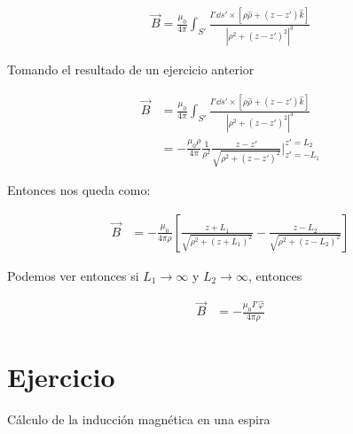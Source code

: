 \documentclass[11pt]{report}
\theoremstyle{plain}
\theoremstyle{definition}
\begin{document}
\begin{align*} %
	\vec{B} = \frac{\mu_0}{4\pi}\int_{S'} \frac{I'\dd{s'}\times\left[\rho\hat{\rho} + \left(z- z'\right)\hat{k}\right]}{|\rho^2 + \left(z- z'\right)^2|^3}
\end{align*}

Tomando el resultado de un ejercicio anterior

\begin{align*} %
	\vec{B} &= \frac{\mu_0}{4\pi}\int_{S'} \frac{I'\dd{s'}\times\left[\rho\hat{\rho} + \left(z- z'\right)\hat{k}\right]}{|\rho^2 + \left(z- z'\right)^2|^3}\\
	&=  -\frac{\mu_0\rho}{4\pi}\frac{1}{\rho^2} \frac{z-z'}{\sqrt{\rho^2 + (z-z')^2}}|^{z' = L_2}_{z' = -L_1}
\end{align*}

Entonces nos queda como:

\begin{align*} %
	\vec{B} &=  -\frac{\mu_0}{4\pi\rho}\left[\frac{z+L_1}{\sqrt{\rho^2 + (z+L_1)^2}}- \frac{z-L_2}{\sqrt{\rho^2 + (z-L_2)^2}}\right]
\end{align*}


Podemos ver entonces si $L_1 \rightarrow \infty$ y $L_2 \rightarrow \infty$, entonces

\begin{align*} %
	\vec{B} &=  -\frac{\mu_0I'\hat{\varphi}}{4\pi\rho}
\end{align*}



\section*{Ejercicio}

Cálculo de la inducción magnética en una espira
\end{document}
